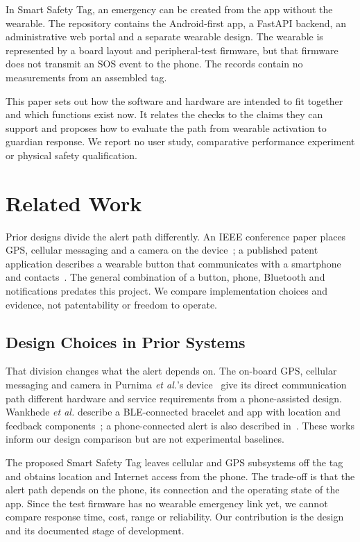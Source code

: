 \documentclass[nolineno]{ieeeaccess}
\begin{document}
In Smart Safety Tag, an emergency can be created from the app without the wearable. The repository contains the Android-first app, a FastAPI backend, an administrative web portal and a separate wearable design. The wearable is represented by a board layout and peripheral-test firmware, but that firmware does not transmit an SOS event to the phone. The records contain no measurements from an assembled tag.

This paper sets out how the software and hardware are intended to fit together and which functions exist now. It relates the checks to the claims they can support and proposes how to evaluate the path from wearable activation to guardian response. We report no user study, comparative performance experiment or physical safety qualification.

\section{Related Work}
Prior designs divide the alert path differently. An IEEE conference paper places GPS, cellular messaging and a camera on the device~\cite{wearable2025}; a published patent application describes a wearable button that communicates with a smartphone and contacts~\cite{patent2024}. The general combination of a button, phone, Bluetooth and notifications predates this project. We compare implementation choices and evidence, not patentability or freedom to operate.


\subsection{Design Choices in Prior Systems}
That division changes what the alert depends on. The on-board GPS, cellular messaging and camera in Purnima \textit{et al.}'s device~\cite{wearable2025} give its direct communication path different hardware and service requirements from a phone-assisted design. Wankhede \textit{et al.} describe a BLE-connected bracelet and app with location and feedback components~\cite{wankhede2025}; a phone-connected alert is also described in~\cite{patent2024}. These works inform our design comparison but are not experimental baselines.

The proposed Smart Safety Tag leaves cellular and GPS subsystems off the tag and obtains location and Internet access from the phone. The trade-off is that the alert path depends on the phone, its connection and the operating state of the app. Since the test firmware has no wearable emergency link yet, we cannot compare response time, cost, range or reliability. Our contribution is the design and its documented stage of development.
\end{document}
